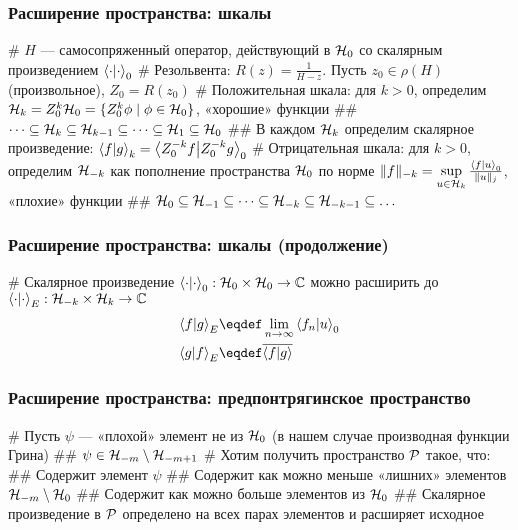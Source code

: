 \documentclass{beamer}
\begin{document}
\begin{frame}[fragile]
\frametitle{Расширение пространства: шкалы}
\begin{easylist}[itemize]
# $H$ — самосопряженный оператор, действующий в $\mathcal{H}_{0}$ со скалярным произведением $\ip{\cdot}{\cdot}_0$
# Резольвента: $R(z) = \frac{1}{H - z}$. Пусть $z_0 \in \rho(H)$ (произвольное), $Z_0 = R(z_0)$
# Положительная шкала: для $k > 0$, определим $\mathcal{H}_{k} = Z_0^k \mathcal{H}_{0} = \{ Z_0^k \phi \mid \phi \in \mathcal{H}_{0} \}$, «хорошие» функции
## $\dots \subseteq \mathcal{H}_{k} \subseteq \mathcal{H}_{k - 1} \subseteq \dots \subseteq \mathcal{H}_{1} \subseteq \mathcal{H}_{0}$
## В каждом $\mathcal{H}_{k}$ определим скалярное произведение: $\ip{f}{g}_k = \ip{Z_0^{-k} f}{Z_0^{-k} g}_0$
# Отрицательная шкала: для $k > 0$, определим $\mathcal{H}_{-k}$ как пополнение пространства $\mathcal{H}_{0}$ по норме $\|f \|_{-k} = \sup\limits_{u \in \hilb{k}} \frac{\ip{f}{u}_0}{\|u\|_j}$, «плохие» функции
## $\mathcal{H}_{0} \subseteq \mathcal{H}_{-1} \subseteq \dots \subseteq \mathcal{H}_{-k} \subseteq \mathcal{H}_{-k - 1} \subseteq \dots $
\end{easylist}
\end{frame}

\begin{frame}[fragile]
\frametitle{Расширение пространства: шкалы (продолжение)}
\begin{easylist}[itemize]
# Скалярное произведение $\ip{\cdot}{\cdot}_0: \hilb{0} \times \hilb{0} \to \bbC$ можно расширить до $\ip{\cdot}{\cdot}_E: \hilb{-k} \times \hilb{k} \to \bbC$
\begin{align*}
\ip{f}{g}_E &\eqdef \lim\limits_{n \to \infty} \ip{f_n}{u}_0 \\
\ip{g}{f}_E &\eqdef \cconj{\ip{f}{g}}
\end{align*}
\end{easylist}
\end{frame}

\begin{frame}[fragile]
\frametitle{Расширение пространства: предпонтрягинское пространство}
\begin{easylist}[itemize]
# Пусть $\psi$ — «плохой» элемент не из $\mathcal{H}_{0}$ (в нашем случае производная функции Грина)
## $\psi \in \mathcal{H}_{-m} \setminus \mathcal{H}_{-m + 1}$ 
# Хотим получить пространство $\mathcal{P}$ такое, что:
## Содержит элемент $\psi$
## Содержит как можно меньше «лишних» элементов $\mathcal{H}_{-m} \setminus \mathcal{H}_{0}$
## Содержит как можно больше элементов из $\mathcal{H}_{0}$
## Скалярное произведение в $\mathcal{P}$ определено на всех парах элементов и расширяет исходное
\end{easylist}
\end{frame}
\end{document}
